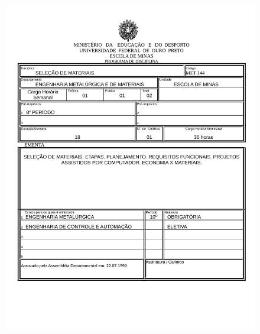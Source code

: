 \begin{figure}[p]
	\centering 
	\includegraphics[scale=0.7]{capitulos/anexo1-programas-disciplina/eg317.pdf}
\end{figure}

